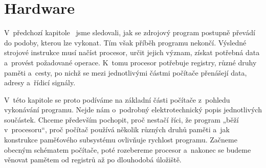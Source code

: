 \chapter{Hardware}\label{chap:hw}

V~předchozí kapitole~ jsme sledovali, jak se zdrojový program postupně převádí do podoby, kterou lze vykonat. Tím však příběh programu nekončí. Výsledné strojové instrukce musí načíst procesor, určit jejich význam, získat potřebná data a~provést požadované operace. K~tomu procesor potřebuje registry, různé druhy paměti a~cesty, po nichž se mezi jednotlivými částmi počítače přenášejí data, adresy a~řídicí signály.

V~této kapitole se proto podíváme na základní části počítače z~pohledu vykonávání programu. Nejde nám o~podrobný elektrotechnický popis jednotlivých součástek. Chceme především pochopit, proč nestačí říci, že program „běží v~procesoru“, proč počítač používá několik různých druhů paměti a~jak konstrukce paměťového subsystému ovlivňuje rychlost programu. Začneme obecným schématem počítače, poté rozebereme procesor a~nakonec se budeme věnovat pamětem od registrů až po dlouhodobá úložiště.







